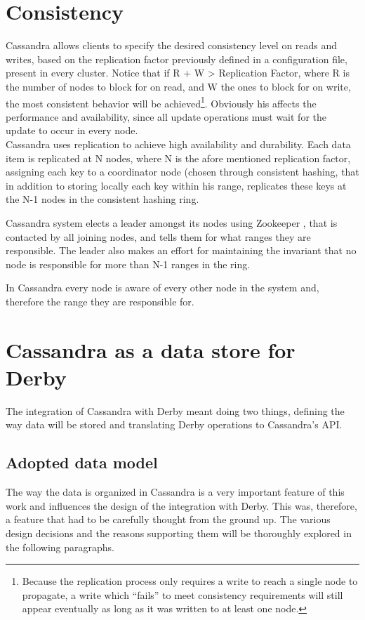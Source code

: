 \section{Consistency}
\label{sec:consistency}
Cassandra allows clients to specify the desired consistency level on reads and writes, based on the replication factor previously defined in a configuration file, present in every cluster. Notice that if R + W > Replication Factor, where R is the number of nodes to block for on read, and W the ones to block for on write, the most consistent behavior will be achieved\footnote{Because the replication process only requires a write to reach a single node to propagate, a write which ``fails'' to meet consistency requirements will still appear eventually as long as it was written to at least one node.}. Obviously his affects the performance and availability, since all update operations must wait for the update to occur in every node.\\

Cassandra uses replication to achieve high availability and durability. Each data item is replicated at N nodes, where N is the afore mentioned replication factor, assigning each key to a coordinator node (chosen through consistent hashing, that in addition to storing locally each key within his range, replicates these keys at the N-1 nodes in the consistent hashing ring. 

Cassandra system elects a leader amongst its nodes using Zookeeper \cite{Junqueira2007}, that is contacted by all joining nodes, and tells them for what ranges they are responsible. The leader also makes an effort for maintaining the invariant that no node is responsible for more than N-1 ranges in the ring. 

In Cassandra every node is aware of every other node in the system and, therefore the range they are responsible for.


\section{Cassandra as a data store for Derby}

The integration of Cassandra with Derby meant doing two things, defining the way data will be stored and translating Derby operations to Cassandra's API. 

\subsection{Adopted data model}
\label{sec:data_model}
The way the data is organized in Cassandra is a very important feature of this work and influences the design of the integration with Derby. This was, therefore, a feature that had to be carefully thought from the ground up. The various design decisions and the reasons supporting them will be thoroughly explored in the following paragraphs.

